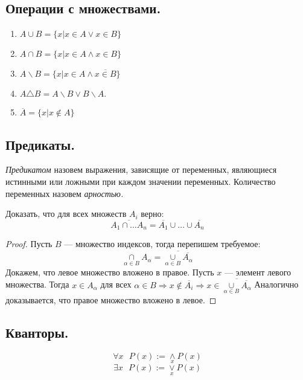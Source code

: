 \subsection{Операции с множествами.}
\begin{definition} 
    \begin{enumerate}
        \item $A \cup B = \{x | x \in A \vee x \in B\}$
        \item $A \cap B = \{x | x \in A \wedge x \in B\}$
        \item $A \backslash B = \{ x | x \in A \wedge \overline{x \in B} \}$
        \item $A \triangle B = A \backslash B \vee B \backslash A.$
        \item $\overline{A} = \{x | x \notin A \}$
    \end{enumerate}
\end{definition}

\subsection{Предикаты.}

\begin{definition}
    \textit{Предикатом} назовем выражения, зависящие от переменных, являющиеся истинными или ложными при каждом значении переменных. Количество переменных назовем \textit{арностью.}
\end{definition}

\begin{problem}
Доказать, что для всех множеств $A_i$ верно:
$$\overline{A_1 \cap \dots A_n} = \overline{A_1} \cup \dots \cup \overline{A_n}$$
\end{problem}

\begin{proof}
    Пусть $B$ --- множество индексов, тогда перепишем требуемое:
    $$\underset{\alpha \in B}{\cap} A_{\alpha} = \overline{\underset{\alpha \in B}{\cup} \overline{A_{\alpha}}}$$
    Докажем, что левое множество вложено в правое. Пусть $x$ --- элемент левого множества. Тогда $x \in A_{\alpha}$ для всех $\alpha \in B \Longrightarrow x \notin \overline{A_i} \Longrightarrow  x \in \overline{\underset{\alpha \in B}{\cup} \overline{A_{\alpha}}}$
    Аналогично доказывается, что правое множество вложено в левое.
\end{proof}

\subsection{Кванторы.}

$$\forall x \text{  } P(x) := \underset{x}{\wedge} P(x)$$
$$\exists x \text{  } P(x) := \underset{x}{\vee} P(x)$$